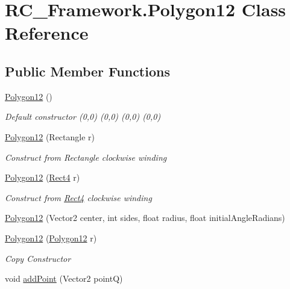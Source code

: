 \hypertarget{class_r_c___framework_1_1_polygon12}{}\section{R\+C\+\_\+\+Framework.\+Polygon12 Class Reference}
\label{class_r_c___framework_1_1_polygon12}
\subsection*{Public Member Functions}
\begin{DoxyCompactItemize}
\item 
\mbox{\hyperlink{class_r_c___framework_1_1_polygon12_aec7781453e11e5b0be7574d23010ac07}{Polygon12}} ()
\begin{DoxyCompactList}\small\item\em Default constructor (0,0) (0,0) (0,0) (0,0)\end{DoxyCompactList}\item 
\mbox{\hyperlink{class_r_c___framework_1_1_polygon12_a178f002cc94e9183d9c3c9e9c919d7fb}{Polygon12}} (Rectangle r)
\begin{DoxyCompactList}\small\item\em Construct from Rectangle clockwise winding \end{DoxyCompactList}\item 
\mbox{\hyperlink{class_r_c___framework_1_1_polygon12_ac40541254b4ea029af66289a6657086e}{Polygon12}} (\mbox{\hyperlink{class_r_c___framework_1_1_rect4}{Rect4}} r)
\begin{DoxyCompactList}\small\item\em Construct from \mbox{\hyperlink{class_r_c___framework_1_1_rect4}{Rect4}} clockwise winding \end{DoxyCompactList}\item 
\mbox{\hyperlink{class_r_c___framework_1_1_polygon12_a6f19bbead12cf9ee65458f023de697d2}{Polygon12}} (Vector2 center, int sides, float radius, float initial\+Angle\+Radians)
\item 
\mbox{\hyperlink{class_r_c___framework_1_1_polygon12_a9ac9fba6dd81e8c7a83dc3ccd9a799da}{Polygon12}} (\mbox{\hyperlink{class_r_c___framework_1_1_polygon12}{Polygon12}} r)
\begin{DoxyCompactList}\small\item\em Copy Constructor \end{DoxyCompactList}\item 
void \mbox{\hyperlink{class_r_c___framework_1_1_polygon12_a4a4389b28bd9d598da3a35221b16ec6c}{add\+Point}} (Vector2 pointQ)

\end{DoxyCompactItemize}
